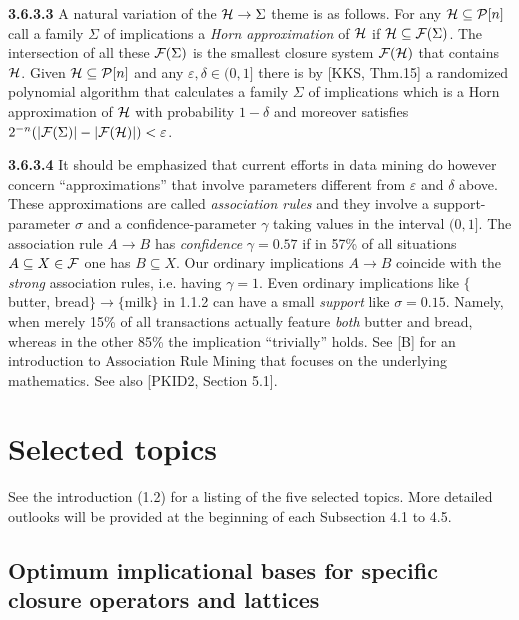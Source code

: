 \documentclass[11pt]{article}
\newcommand{\ra}{\rightarrow}
\begin{document}
  
{\bf 3.6.3.3} A natural variation of the ${\cal H} \ra \Sigma$ theme is as follows. For any ${\cal H} \subseteq {\cal P}[n]$ call a family $\Sigma$ of implications a {\it Horn approximation} of ${\cal H}$ if ${\cal H} \subseteq {\cal F}(\Sigma)$. The intersection of all these ${\cal F}(\Sigma)$ is the smallest closure system ${\cal F}({\cal H})$ that contains ${\cal H}$.  Given ${\cal H} \subseteq {\cal P}[n]$ and any $\varepsilon, \delta \in (0,1]$ there is by [KKS, Thm.15] a randomized polynomial algorithm that calculates a family $\Sigma$ of implications which is a Horn approximation of ${\cal H}$ with probability $1 - \delta$ and moreover satisfies $2^{-n}(|{\cal F}(\Sigma)| - |{\cal F}({\cal H})|) < \varepsilon$.
 
{\bf 3.6.3.4} It should be emphasized that current efforts in data mining do however concern ``approximations'' that involve parameters different from $\varepsilon$ and $\delta$ above. These approximations are called {\it association rules} and they involve a support-parameter $\sigma$ and a confidence-parameter $\gamma$ taking values in the interval $(0,1]$. The association rule $A \ra B$ has {\it confidence} $\gamma = 0.57$ if in 57\% of all situations $A \subseteq X \in {\cal F}$ one has $B \subseteq X$. Our ordinary implications $A \ra B$ coincide with the {\it strong} association rules, i.e. having $\gamma =1$. Even ordinary implications like $\{$butter, bread$\} \ra \{$milk$\}$ in 1.1.2 can have a small {\it support} like $\sigma = 0.15$. Namely, when merely 15\% of all transactions  actually feature {\it both} butter and bread, whereas in the other 85\% the implication ``trivially'' holds. See [B] for an introduction to Association Rule Mining that focuses on the underlying mathematics. See also [PKID2, Section 5.1].




\section{Selected topics}

See the introduction (1.2) for a listing of the five selected topics. More detailed outlooks will be provided at the beginning of each Subsection 4.1 to 4.5.

\subsection{Optimum implicational bases for specific closure operators and lattices}
\end{document}
